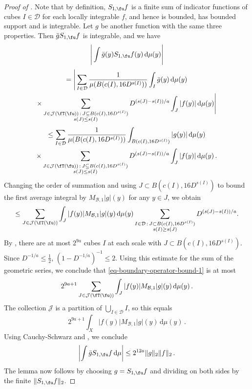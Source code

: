 \begin{proof}[Proof of ]
    \leanok
    Note that by definition, $S_{1,\fu}f$ is a finite sum of indicator functions of cubes $I \in \mathcal{D}$ for each locally integrable $f$, and hence is bounded, has bounded support and is integrable. Let $g$ be another function with the same three properties. Then $\bar g S_{1,\fu}f$ is integrable, and we have
    $$
        \Bigg|\int \bar g(y) S_{1,\fu}f(y) \, \mathrm{d}\mu(y)\Bigg|
    $$
    \begin{multline*}
        = \Bigg|\sum_{I\in\mathcal{D}} \frac{1}{\mu(B(c(I), 16 D^{s(I)}))} \int_I \bar g(y) \, \mathrm{d}\mu(y)\\
        \times \sum_{\substack{J\in \mathcal{J}(\fT(\fu))\,:\,J\subseteq B(c(I), 16 D^{s(I)})\\s(J)\le s(I)}} D^{(s(J)-s(I))/a}\int_J |f(y)| \,\mathrm{d}\mu(y)\Bigg|
    \end{multline*}
    \begin{multline*}
        \le \sum_{I\in\mathcal{D}} \frac{1}{\mu(B(c(I), 16D^{s(I)}))} \int_{B(c(I), 16D^{s(I)})} | g(y)| \, \mathrm{d}\mu(y)\\ \times \sum_{\substack{J\in \mathcal{J}(\fT(\fu))\,:\,J\subseteq B(c(I), 16 D^{s(I)})\\ s(J) \le s(I)}} D^{(s(J)-s(I))/a}\int_J |f(y)| \,\mathrm{d}\mu(y)\,.
    \end{multline*}
    Changing the order of summation and using $J \subset B(c(I), 16 D^{s(I)})$ to bound the first average integral by $M_{\mathcal{B},1}|g|(y)$ for any $y \in J$, we obtain
    \begin{align}
    \label{eq-boundary-operator-bound-1}
        \le \sum_{J\in\mathcal{J}(\fT(\fu))}\int_J|f(y)| M_{\mathcal{B},1}|g|(y) \, \mathrm{d}\mu(y) \sum_{\substack{I \in \mathcal{D} \, : \, J\subset B(c(I),16 D^{s(I)})\\ s(I) \ge s(J)}} D^{(s(J)-s(I))/a}.
    \end{align}
    By , there are at most $2^{9a}$ cubes $I$ at each scale with $J \subset B(c(I),16D^{s(I)})$.
    Since $D^{-1/a}\le\frac12$, $(1 - D^{-1/a})^{-1} \le 2$.
    Using this estimate for the sum of the geometric series, we conclude that \eqref{eq-boundary-operator-bound-1} is at most
    $$
        2^{9a+1} \sum_{J\in\mathcal{J}(\fT(\fu))}\int_J|f(y)| M_{\mathcal{B},1}|g|(y) \, \mathrm{d}\mu(y)\,.
    $$
    The collection $\mathcal{J}$ is a partition of $\bigcup_{I \in \mathcal{D}} I$, so this equals
    $$
        2^{9a+1} \int_X|f(y)| M_{\mathcal{B},1}|g|(y) \, \mathrm{d}\mu(y)\,.
    $$
    Using Cauchy-Schwarz and , we conclude
    $$
        \left|\int \bar g S_{1,\fu}f \, \mathrm{d}\mu \right| \le 2^{12a} \|g\|_2\|f\|_2\,.
    $$
    The lemma now follows by choosing $g = S_{1,\fu}f$ and dividing on both sides by the finite $\|S_{1,\fu}f\|_2$.
\end{proof}

